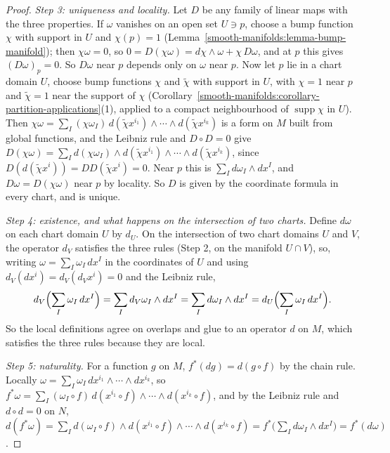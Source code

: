 \begin{proof}
\emph{Step 3: uniqueness and locality.} Let $D$ be any family of linear maps with the three properties. If $\omega$ vanishes on an open set $U \ni p$, choose a bump function
$\chi$ with support in $U$ and $\chi(p) = 1$ (Lemma~\ref{smooth-manifolds:lemma-bump-manifold}); then $\chi\omega = 0$, so $0 = D(\chi\omega) = d\chi \wedge \omega + \chi\,D\omega$, and at
$p$ this gives $(D\omega)_p = 0$. So $D\omega$ near $p$ depends only on $\omega$ near $p$. Now let $p$ lie in a chart domain $U$, choose bump functions $\chi$ and $\tilde\chi$ with
support in $U$, with $\chi = 1$ near $p$ and $\tilde\chi = 1$ near the support of $\chi$
(Corollary~\ref{smooth-manifolds:corollary-partition-applications}(1), applied to a compact neighbourhood of $\operatorname{supp}\chi$ in $U$). Then $\chi\omega = \sum_I(\chi\omega_I)\,d(\tilde\chi x^{i_1}) \wedge \cdots \wedge d(\tilde\chi x^{i_k})$
is a form on $M$ built from global functions, and the Leibniz rule and $D \circ D = 0$ give $D(\chi\omega) = \sum_Id(\chi\omega_I) \wedge d(\tilde\chi x^{i_1}) \wedge \cdots \wedge d(\tilde\chi x^{i_k})$, since
$D(d(\tilde\chi x^i)) = DD(\tilde\chi x^i) = 0$. Near $p$ this is $\sum_Id\omega_I \wedge dx^I$, and $D\omega = D(\chi\omega)$ near $p$ by locality. So $D$ is given by the coordinate formula
in every chart, and is unique.

\emph{Step 4: existence, and what happens on the intersection of two charts.} Define $d\omega$ on each chart domain $U$ by $d_U$. On the intersection of two chart domains $U$ and $V$,
the operator $d_V$ satisfies the three rules (Step 2, on the manifold $U \cap V$), so, writing $\omega = \sum_I\omega_I\,dx^I$ in the coordinates of $U$ and using
$d_V(dx^i) = d_V(d_Vx^i) = 0$ and the Leibniz rule,
\[
d_V\Bigl(\sum_I\omega_I\,dx^I\Bigr) = \sum_Id_V\omega_I \wedge dx^I = \sum_Id\omega_I \wedge dx^I = d_U\Bigl(\sum_I\omega_I\,dx^I\Bigr).
\]
So the local definitions agree on overlaps and glue to an operator $d$ on $M$, which satisfies the three rules because they are local.

\emph{Step 5: naturality.} For a function $g$ on $M$, $f^*(dg) = d(g \circ f)$ by the chain rule. Locally $\omega = \sum_I\omega_I\,dx^{i_1} \wedge \cdots \wedge dx^{i_k}$, so
$f^*\omega = \sum_I(\omega_I \circ f)\,d(x^{i_1} \circ f) \wedge \cdots \wedge d(x^{i_k} \circ f)$, and by the Leibniz rule and $d \circ d = 0$ on $N$,
$d(f^*\omega) = \sum_Id(\omega_I \circ f) \wedge d(x^{i_1} \circ f) \wedge \cdots \wedge d(x^{i_k} \circ f) = f^*\bigl(\sum_Id\omega_I \wedge dx^I\bigr) = f^*(d\omega)$.


\end{proof}
